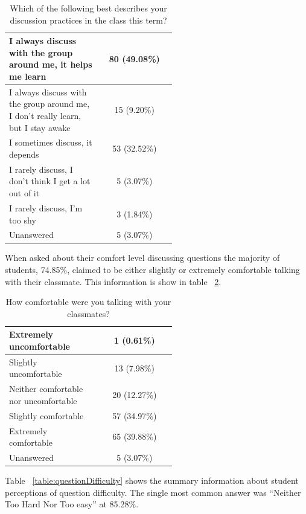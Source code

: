 \documentclass[12pt]{article}
\begin{document}
\begin{table}[ht]
\caption{Which of the following best describes your discussion practices in the class this term?}
\begin{tabular}{p{0.55\linewidth}|c} %
\toprule
 \rowcolor{LightGray}  %
 I always discuss with the group around me, it helps me learn & 80 (49.08\%)\\\midrule 
 I always discuss with the group around me, I don't really learn, but I stay awake & 15 (9.20\%)\\\midrule 
 \rowcolor{LightGray}
 I sometimes discuss, it depends & 53 (32.52\%)\\\midrule 
 I rarely discuss, I don't think I get a lot out of it & 5 (3.07\%)\\\midrule 
 \rowcolor{LightGray}
 I rarely discuss, I'm too shy & 3 (1.84\%)\\\midrule 
 Unanswered & 5 (3.07\%)\\\bottomrule 
\end{tabular}
\label{table:groupDiscussion}
\end{table}

When asked about their comfort level discussing questions the majority of students, 74.85\%, claimed to be either slightly or extremely comfortable talking with their classmate. This information is show in table ~\ref{table:group_comfort}.

\begin{table}[ht]
\caption{How comfortable were you talking with your classmates?}
\begin{tabular}{p{0.55\linewidth}|c} %
\toprule
 \rowcolor{LightGray} 
 Extremely uncomfortable & 1 (0.61\%)\\\midrule 
 Slightly uncomfortable & 13 (7.98\%)\\\midrule 
 \rowcolor{LightGray}
 Neither comfortable nor uncomfortable & 20 (12.27\%)\\\midrule 
 Slightly comfortable & 57 (34.97\%)\\\midrule 
 \rowcolor{LightGray}
 Extremely comfortable & 65 (39.88\%)\\\midrule 
 Unanswered & 5 (3.07\%)\\\bottomrule 
\end{tabular}
\label{table:group_comfort}
\end{table}

Table ~\ref{table:questionDifficulty} shows the summary information about student perceptions of question difficulty. The single most common answer was ``Neither Too Hard Nor Too easy'' at 85.28\%. 
\end{document}
